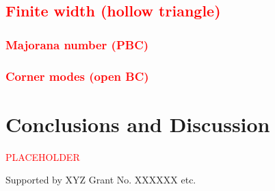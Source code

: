 \documentclass[aps,prb,showpacs,twocolumn,amsmath,amssymb,superscriptaddress]{revtex4-2}
\newcommand{\Red}[1]{\textcolor{red}{#1}}
\begin{document}
\subsection{\Red{Finite width (hollow triangle)}}

\subsubsection{\Red{Majorana number (PBC)}}

\subsubsection{\Red{Corner modes (open BC)}}

\section{Conclusions and Discussion}

\Red{PLACEHOLDER}


\begin{acknowledgements}
  Supported by XYZ Grant No. XXXXXX etc.
\end{acknowledgements}


%
\end{document}
